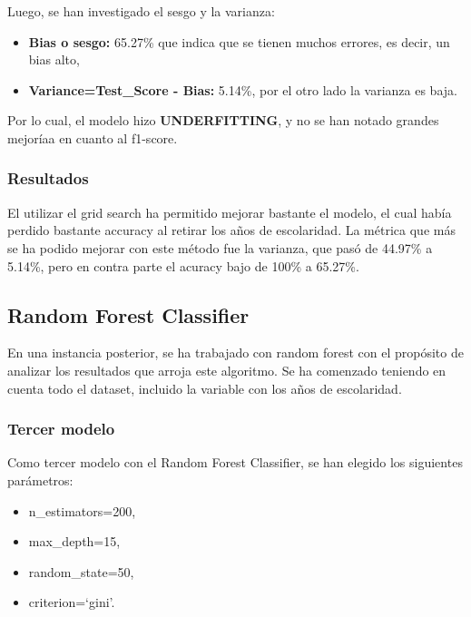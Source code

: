 \documentclass[a4paper]{article}
\begin{document}
            Luego, se han investigado el sesgo y la varianza:
            \begin{itemize}
                \item \textbf{Bias o sesgo:} 65.27\% que indica que se tienen muchos errores, es decir, un bias alto,
                \item \textbf{Variance=Test\_Score - Bias:} 5.14\%, por el otro lado la varianza es baja.
            \end{itemize}

            Por lo cual, el modelo hizo \textbf{UNDERFITTING}, y no se han notado grandes mejoríaa en cuanto al f1-score.

            \subsubsection*{Resultados}

            El utilizar el grid search ha permitido mejorar bastante el modelo, el cual había perdido bastante accuracy al retirar los años de escolaridad. La métrica que más se ha podido mejorar con este método fue la varianza, que pasó de 44.97\% a 5.14\%, pero en contra parte el acuracy bajo de 100\% a 65.27\%.

    \subsection{Random Forest Classifier}
        
        En una instancia posterior, se ha trabajado con random forest con el propósito de analizar los resultados que arroja este algoritmo. Se ha comenzado teniendo en cuenta todo el dataset, incluido la variable con los años de escolaridad. 

        \subsubsection{Tercer modelo}

            Como tercer modelo con el Random Forest Classifier, se han elegido los siguientes parámetros:
            \begin{itemize}
                \item n\_estimators=200,
                \item max\_depth=15,
                \item random\_state=50,
                \item criterion=`gini'.
            \end{itemize}
\end{document}
